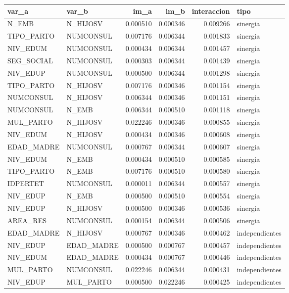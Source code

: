 \begin{tabular}{llrrrl}
\toprule
var\_a & var\_b & im\_a & im\_b & interaccion & tipo \\
\midrule
N\_EMB & N\_HIJOSV & 0.000510 & 0.000346 & 0.009266 & sinergia \\
TIPO\_PARTO & NUMCONSUL & 0.007176 & 0.006344 & 0.001833 & sinergia \\
NIV\_EDUM & NUMCONSUL & 0.000434 & 0.006344 & 0.001457 & sinergia \\
SEG\_SOCIAL & NUMCONSUL & 0.000303 & 0.006344 & 0.001439 & sinergia \\
NIV\_EDUP & NUMCONSUL & 0.000500 & 0.006344 & 0.001298 & sinergia \\
TIPO\_PARTO & N\_HIJOSV & 0.007176 & 0.000346 & 0.001154 & sinergia \\
NUMCONSUL & N\_HIJOSV & 0.006344 & 0.000346 & 0.001151 & sinergia \\
NUMCONSUL & N\_EMB & 0.006344 & 0.000510 & 0.001118 & sinergia \\
MUL\_PARTO & N\_HIJOSV & 0.022246 & 0.000346 & 0.000855 & sinergia \\
NIV\_EDUM & N\_HIJOSV & 0.000434 & 0.000346 & 0.000608 & sinergia \\
EDAD\_MADRE & NUMCONSUL & 0.000767 & 0.006344 & 0.000607 & sinergia \\
NIV\_EDUM & N\_EMB & 0.000434 & 0.000510 & 0.000585 & sinergia \\
TIPO\_PARTO & N\_EMB & 0.007176 & 0.000510 & 0.000580 & sinergia \\
IDPERTET & NUMCONSUL & 0.000011 & 0.006344 & 0.000557 & sinergia \\
NIV\_EDUP & N\_EMB & 0.000500 & 0.000510 & 0.000554 & sinergia \\
NIV\_EDUP & N\_HIJOSV & 0.000500 & 0.000346 & 0.000536 & sinergia \\
AREA\_RES & NUMCONSUL & 0.000154 & 0.006344 & 0.000506 & sinergia \\
EDAD\_MADRE & N\_HIJOSV & 0.000767 & 0.000346 & 0.000462 & independientes \\
NIV\_EDUP & EDAD\_MADRE & 0.000500 & 0.000767 & 0.000457 & independientes \\
NIV\_EDUM & EDAD\_MADRE & 0.000434 & 0.000767 & 0.000446 & independientes \\
MUL\_PARTO & NUMCONSUL & 0.022246 & 0.006344 & 0.000431 & independientes \\
NIV\_EDUP & MUL\_PARTO & 0.000500 & 0.022246 & 0.000425 & independientes \\

\end{tabular}
